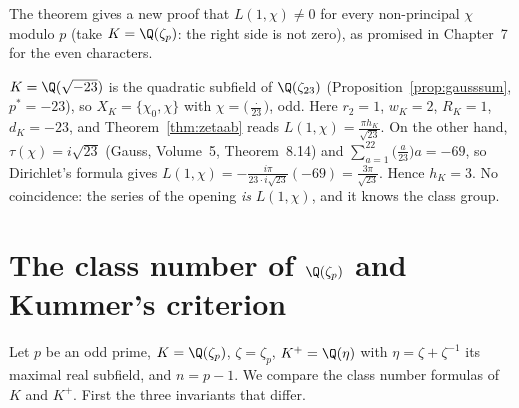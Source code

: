 The theorem gives a new proof that $L(1,\chi)\ne0$ for every non-principal $\chi$ modulo $p$ (take $K=\Q(\zeta_p)$: the right side is
not zero), as promised in Chapter~7 for the even characters.

\begin{example}\label{exa:h23}
$K=\Q(\sqrt{-23})$ is the quadratic subfield of $\Q(\zeta_{23})$ (Proposition~\ref{prop:gausssum}, $p^*=-23$), so $X_K=\{\chi_0,\chi\}$ with
$\chi=\bigl(\frac\cdot{23}\bigr)$, odd. Here $r_2=1$, $w_K=2$, $R_K=1$, $d_K=-23$, and Theorem~\ref{thm:zetaab} reads $L(1,\chi)=\frac{\pi h_K}
{\sqrt{23}}$. On the other hand, $\tau(\chi)=i\sqrt{23}$ (Gauss, Volume~5, Theorem~8.14) and $\sum_{a=1}^{22}\bigl(\frac a{23}\bigr)a=-69$,
so Dirichlet's formula gives $L(1,\chi)=-\frac{i\pi}{23\cdot i\sqrt{23}}(-69)=\frac{3\pi}{\sqrt{23}}$. Hence $h_K=3$. No coincidence:
the series of the opening \emph{is} $L(1,\chi)$, and it knows the class group.
\end{example}

\section{The class number of \texorpdfstring{$\Q(\zeta_p)$}{Q(zeta p)} and Kummer's criterion}

Let $p$ be an odd prime, $K=\Q(\zeta_p)$, $\zeta=\zeta_p$, $K^+=\Q(\eta)$ with $\eta=\zeta+\zeta^{-1}$ its maximal real subfield, and $n=p-1$.
We compare the class number formulas of $K$ and $K^+$. First the three invariants that differ.


